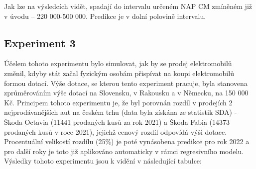 \documentclass[14pt]{extarticle}
\begin{document}
    Jak lze na výsledcích vidět, spadají do intervalu určeném NAP CM zmíněném již v úvodu -- 220 000-500 000. Predikce je v dolní polovině intervalu.
    
    \subsection{Experiment 3}
    Účelem tohoto experimentu bylo simulovat, jak by se prodej elektromobilů změnil, kdyby stát začal fyzickým osobám přispívat na koupi elektromobilů formou dotací. Výše dotace, se kterou tento experiment pracuje, byla stanovena zprůměrováním výše dotací na Slovensku, v Rakousku a v Německu, na 150 000 Kč. Principem tohoto experimentu je, že byl porovnán rozdíl v prodejích 2 nejprodávanějších aut na českém trhu (data byla získána ze statistik SDA) - Škoda Octavia (11441 prodaných kusů za rok 2021) a Škoda Fabia (14373 prodaných kusů v roce 2021), jejichž cenový rozdíl odpovídá výši dotace. Procentuální velikostí rozdílu (25\%) je poté vynásobena predikce pro rok 2022 a pro další roky je toto již aplikováno automaticky v rámci regresivního modelu. Výsledky tohoto experimentu jsou k vidění v následující tabulce:
    
\end{document}
